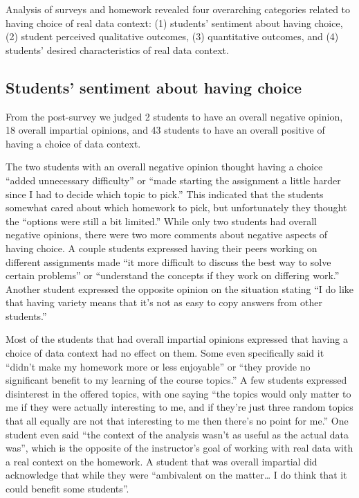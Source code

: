 \documentclass[
  12pt]{article}
\begin{document}
Analysis of surveys and homework revealed four overarching categories
related to having choice of real data context: (1) students' sentiment
about having choice, (2) student perceived qualitative outcomes, (3)
quantitative outcomes, and (4) students' desired characteristics of real
data context.

\subsection{Students' sentiment about having
choice}\label{students-sentiment-about-having-choice}

From the post-survey we judged 2 students to have an overall negative
opinion, 18 overall impartial opinions, and 43 students to have an
overall positive of having a choice of data context.

The two students with an overall negative opinion thought having a
choice ``added unnecessary difficulty'' or ``made starting the
assignment a little harder since I had to decide which topic to pick.''
This indicated that the students somewhat cared about which homework to
pick, but unfortunately they thought the ``options were still a bit
limited.'' While only two students had overall negative opinions, there
were two more comments about negative aspects of having choice. A couple
students expressed having their peers working on different assignments
made ``it more difficult to discuss the best way to solve certain
problems'' or ``understand the concepts if they work on differing
work.'' Another student expressed the opposite opinion on the situation
stating ``I do like that having variety means that it's not as easy to
copy answers from other students.''

Most of the students that had overall impartial opinions expressed that
having a choice of data context had no effect on them. Some even
specifically said it ``didn't make my homework more or less enjoyable''
or ``they provide no significant benefit to my learning of the course
topics.'' A few students expressed disinterest in the offered topics,
with one saying ``the topics would only matter to me if they were
actually interesting to me, and if they're just three random topics that
all equally are not that interesting to me then there's no point for
me.'' One student even said ``the context of the analysis wasn't as
useful as the actual data was'', which is the opposite of the
instructor's goal of working with real data with a real context on the
homework. A student that was overall impartial did acknowledge that
while they were ``ambivalent on the matter\ldots{} I do think that it
could benefit some students''.
\end{document}
